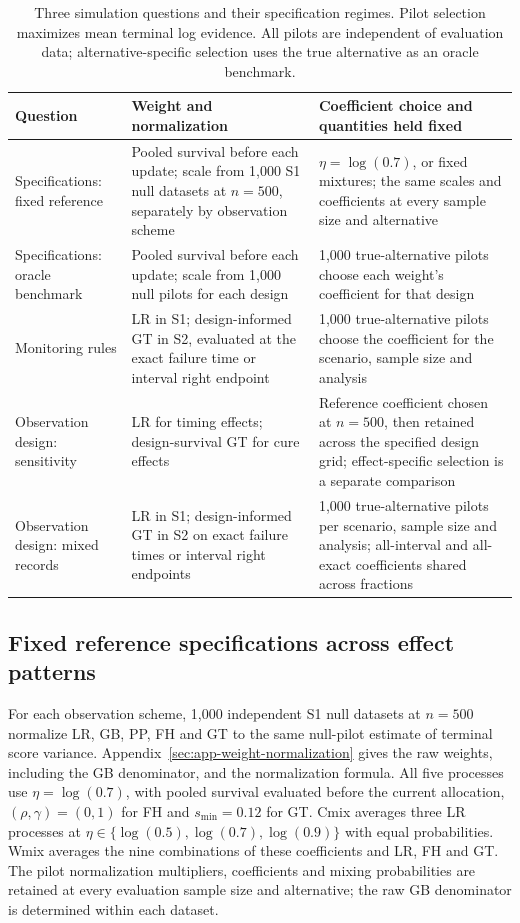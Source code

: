 \documentclass[12pt]{article}
\theoremstyle{definition}
\theoremstyle{remark}
\begin{document}
\begin{table}[H]
\centering
\small
\caption{Three simulation questions and their specification regimes. Pilot selection maximizes mean terminal log evidence. All pilots are independent of evaluation data; alternative-specific selection uses the true alternative as an oracle benchmark.}
\label{tab:simulation-specifications}
\begin{tabularx}{\textwidth}{@{}>{\raggedright\arraybackslash}p{}>{\raggedright\arraybackslash}p{}Y@{}}
\toprule
Question & Weight and normalization & Coefficient choice and quantities held fixed \\
\midrule
Specifications: fixed reference & Pooled survival before each update; scale from 1,000 S1 null datasets at $n=500$, separately by observation scheme & $\eta=\log(0.7)$, or fixed mixtures; the same scales and coefficients at every sample size and alternative \\
Specifications: oracle benchmark & Pooled survival before each update; scale from 1,000 null pilots for each design & 1,000 true-alternative pilots choose each weight's coefficient for that design \\
Monitoring rules & LR in S1; design-informed GT in S2, evaluated at the exact failure time or interval right endpoint & 1,000 true-alternative pilots choose the coefficient for the scenario, sample size and analysis \\
Observation design: sensitivity & LR for timing effects; design-survival GT for cure effects & Reference coefficient chosen at $n=500$, then retained across the specified design grid; effect-specific selection is a separate comparison \\
Observation design: mixed records & LR in S1; design-informed GT in S2 on exact failure times or interval right endpoints & 1,000 true-alternative pilots per scenario, sample size and analysis; all-interval and all-exact coefficients shared across fractions \\
\bottomrule
\end{tabularx}
\end{table}

\subsection{Fixed reference specifications across effect patterns}
\label{sec:fixed-design-comparison}

For each observation scheme, 1,000 independent S1 null datasets at $n=500$ normalize LR, GB, PP, FH and GT to the same null-pilot estimate of terminal score variance. Appendix~\ref{sec:app-weight-normalization} gives the raw weights, including the GB denominator, and the normalization formula. All five processes use $\eta=\log(0.7)$, with pooled survival evaluated before the current allocation, $(\rho,\gamma)=(0,1)$ for FH and $s_{\min}=0.12$ for GT. Cmix averages three LR processes at $\eta\in\{\log(0.5),\log(0.7),\log(0.9)\}$ with equal probabilities. Wmix averages the nine combinations of these coefficients and LR, FH and GT. The pilot normalization multipliers, coefficients and mixing probabilities are retained at every evaluation sample size and alternative; the raw GB denominator is determined within each dataset.
\end{document}

